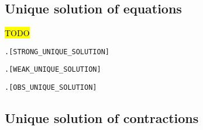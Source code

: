 
\subsection{Unique solution of equations}

\hl{TODO}
\begin{alltt}
\HOLTokenTurnstile{}   \HOLSymConst{\HOLTokenImp{}} \HOLSymConst{\HOLTokenForall{}} .  \HOLSymConst{\HOLTokenStrongEQ}   \HOLSymConst{\HOLTokenConj{}}  \HOLSymConst{\HOLTokenStrongEQ}   \HOLSymConst{\HOLTokenImp{}}  \HOLSymConst{\HOLTokenStrongEQ} \hfill{[STRONG_UNIQUE_SOLUTION]}
\end{alltt}

\begin{alltt}
\HOLTokenTurnstile{}   \HOLSymConst{\HOLTokenConj{}}   \HOLSymConst{\HOLTokenImp{}} \HOLSymConst{\HOLTokenForall{}} .  \HOLSymConst{\HOLTokenWeakEQ}   \HOLSymConst{\HOLTokenConj{}}  \HOLSymConst{\HOLTokenWeakEQ}   \HOLSymConst{\HOLTokenImp{}}  \HOLSymConst{\HOLTokenWeakEQ} \hfill{[WEAK_UNIQUE_SOLUTION]}
\end{alltt}

\begin{alltt}
\HOLTokenTurnstile{}   \HOLSymConst{\HOLTokenConj{}}   \HOLSymConst{\HOLTokenImp{}} \HOLSymConst{\HOLTokenForall{}} .  \HOLSymConst{\HOLTokenObsCongr}   \HOLSymConst{\HOLTokenConj{}}  \HOLSymConst{\HOLTokenObsCongr}   \HOLSymConst{\HOLTokenImp{}}  \HOLSymConst{\HOLTokenObsCongr} \hfill{[OBS_UNIQUE_SOLUTION]}
\end{alltt}

\subsection{Unique solution of contractions}

